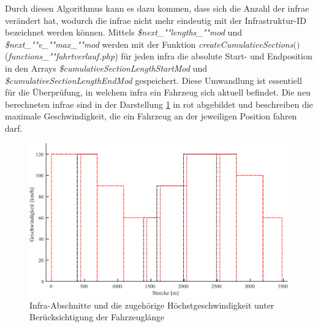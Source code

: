 Durch diesen Algorithmus kann es dazu kommen, dass sich die Anzahl der \ac{infra}e verändert hat, wodurch die \ac{infra}e nicht mehr eindeutig mit der Infrastruktur-ID bezeichnet werden können. Mittels \textit{\$next\_""lengths\_""mod} und \textit{\$next\_""v\_""max\_""mod} werden mit der Funktion \textit{create\-Cumulative\-Sec\-tions$($$)$} (\textit{func\-tions\_""fahrt\-ver\-lauf.php}) für jeden \ac{infra} die absolute Start- und Endposition in den Arrays \textit{\$cumulative\-Section\-Length\-Start\-Mod} und \textit{\$cumulativeSectionLengthEndMod} gespeichert. Diese Umwandlung ist essentiell für die Überprüfung, in welchem \ac{infra} ein Fahrzeug sich aktuell befindet. Die neu berechneten \ac{infra}e sind in der Darstellung \ref{fig:it2} in rot abgebildet und beschreiben die maximale Geschwindigkeit, die ein Fahrzeug an der jeweiligen Position fahren darf.
\begin{figure}
\includegraphics[width=\linewidth]{../images/matlab/it2.pdf}
\caption{Infra-Abschnitte und die zugehörige Höchstgeschwindigkeit unter Berücksichtigung der Fahrzeuglänge}
\label{fig:it2}
\end{figure}
